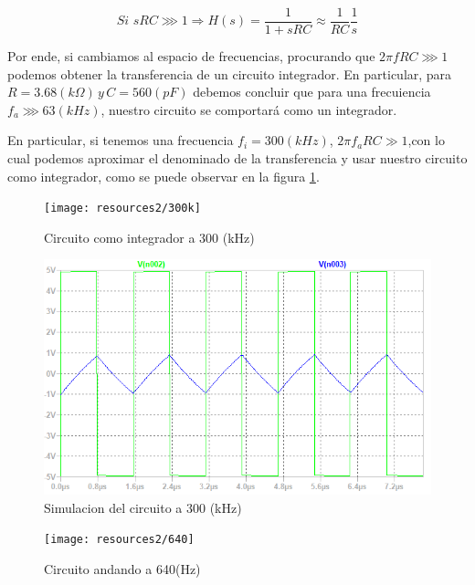 \[
Si\,\,sRC\ggg1\Longrightarrow H(s)=\frac{1}{1+sRC}\approx\frac{1}{RC}\frac{1}{s}
\]

Por ende, si cambiamos al espacio de frecuencias, procurando que $2\pi fRC\ggg1$
podemos obtener la transferencia de un circuito integrador. En particular,
para $R=3.68(k\Omega)\,y\,C=560(pF)$ debemos concluir que para una
frecuiencia $f_{a}\ggg63(kHz)$, nuestro circuito se comportará como
un integrador.

En particular, si tenemos una frecuencia $f_{i}=300(kHz)$, $2\pi f_{a}RC\gg1$,con
lo cual podemos aproximar el denominado de la transferencia y usar
nuestro circuito como integrador, como se puede observar en la figura
\ref{2_6}.

\begin{figure}[h]
\begin{centering}
\texttt{[image: resources2/300k]}
\par\end{centering}
\caption{Circuito como integrador a 300 (kHz)}
\label{2_6}

\end{figure}

\begin{figure}[h]
\begin{centering}
\includegraphics[scale=0.6]{resources2/sim}
\par\end{centering}
\caption{Simulacion del circuito a 300 (kHz)}

\end{figure}

\begin{figure}[h]
\begin{centering}
\texttt{[image: resources2/640]}
\par\end{centering}
\caption{Circuito andando a 640(Hz)}

\end{figure}